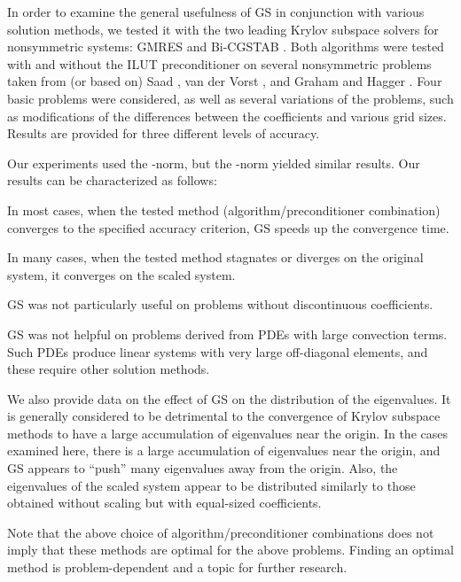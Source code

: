 \documentclass[12pt,a4paper]{article}
\renewenvironment{itemize}
{
\begin{list}
{}
{
\setlength{\leftmargin}{25pt}
\setlength{\rightmargin}{0pt}
\setlength{\parsep}{0pt}
\setlength{\itemsep}{0pt}
\setlength{\topsep}{\parskip}
\setlength{\parskip}{0pt}
\setlength{\baselineskip}{14pt}
\setlength{\labelsep}{3pt}
}
}
{\end{list}}
\newcounter{i}
\def\bi{\begin{itemize}}
\def\ei{\end{itemize}}
\begin{document}
In order to examine the general usefulness of GS in conjunction with
various solution methods, we tested it with the two leading Krylov 
subspace solvers for nonsymmetric systems: GMRES \cite{Saad86} and 
Bi-CGSTAB \cite{Vorst92}.  Both algorithms were tested with and 
without the ILUT preconditioner \cite{Saad94} on several nonsymmetric 
problems taken from (or based on) Saad \cite{Saad03}, van der Vorst
\cite{Vorst92}, and Graham and Hagger \cite{Graham99}.  Four basic 
problems were considered, as well as several variations of the 
problems, such as modifications of the differences between the 
coefficients and various grid sizes.  Results are provided for 
three different levels of accuracy.  

Our experiments used the -norm, but the -norm yielded
similar results.  Our results can be characterized as follows:
\bi
\item In most cases, when the tested method (algorithm/preconditioner
combination) converges to the specified accuracy criterion, GS speeds
up the convergence time.
\item In many cases, when the tested method stagnates or diverges
on the original system, it converges on the scaled system.
\item GS was not particularly useful on problems without discontinuous
coefficients.
\item GS was not helpful on problems derived from PDEs with large
convection terms.  Such PDEs produce linear systems with very large
off-diagonal elements, and these require other solution methods.
\ei

We also provide data on the effect of GS on the distribution of the 
eigenvalues.  It is generally considered to be detrimental to the
convergence of Krylov subspace methods to have a large accumulation
of eigenvalues near the origin.
In the cases examined here, there is a large accumulation of 
eigenvalues near the origin, and GS appears to ``push'' many 
eigenvalues away from the origin.  Also, the eigenvalues of 
the scaled system appear to be distributed similarly to those 
obtained without scaling but with equal-sized coefficients.  

Note that the above choice of algorithm/preconditioner combinations 
does not imply that these methods are optimal for the above problems. 
Finding an optimal method is problem-dependent and a topic for
further research.
\end{document}
